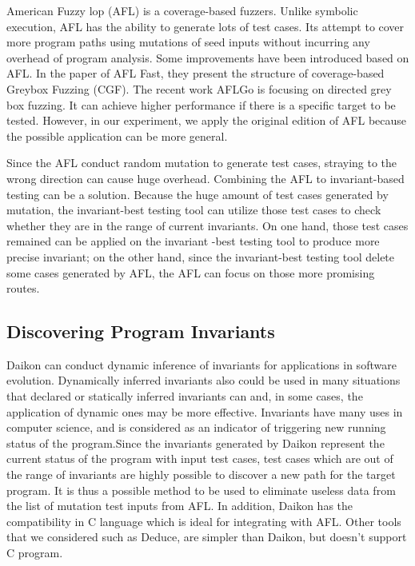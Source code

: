 \documentclass[sigplan,10pt,review = false]{acmart}\settopmatter{printfolios=true,printccs=false,printacmref=false}
\begin{document}
American Fuzzy lop (AFL)\cite{gutmannfuzzing} is a coverage-based fuzzers. Unlike symbolic execution, AFL has the ability to generate lots of test cases. Its attempt to cover more program paths using mutations of seed inputs without incurring any overhead of program analysis. Some improvements have been introduced based on AFL. In the paper of AFL Fast\cite{ernst2001dynamically}, they present the structure of coverage-based Greybox Fuzzing (CGF). The recent work AFLGo\cite{bohme2017directed} is focusing on directed grey box fuzzing. It can achieve higher performance if there is a specific target to be tested. However, in our experiment, we apply the original edition of AFL because the possible application can be more general.

Since the AFL conduct random mutation to generate test cases, straying to the wrong direction can cause huge overhead. Combining the AFL to invariant-based testing can be a solution. Because the huge amount of test cases generated by mutation, the invariant-best testing tool can utilize those test cases to check whether they are in the range of current invariants. On one hand, those test cases remained can be applied on the invariant -best testing tool to produce more precise invariant; on the other hand, since the invariant-best testing tool delete some cases generated by AFL, the AFL can focus on those more promising routes.

\subsection{Discovering Program Invariants} 
Daikon\cite{ernst2001dynamically} can conduct dynamic inference of invariants for applications in software evolution. Dynamically inferred invariants also could be used in many situations that declared or statically inferred invariants can and, in some cases, the application of dynamic ones may be more effective. Invariants have many uses in computer science, and is considered as an indicator of triggering new running status of the program.Since the invariants generated by Daikon represent the current status of the program with input test cases, test cases which are out of the range of invariants are highly possible to discover a new path for the target program. It is thus a possible method to be used to eliminate useless data from the list of mutation test inputs from AFL. In addition, Daikon has the compatibility in C language which is ideal for integrating with AFL. Other tools that we considered such as Deduce\cite{hangal2002tracking}, are simpler than Daikon, but doesn't support C program.
\end{document}
